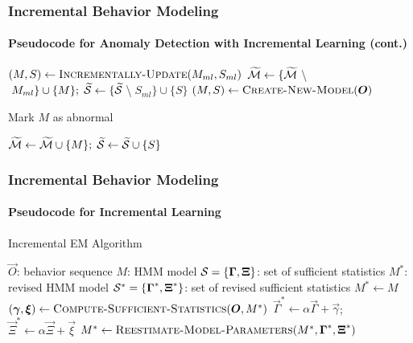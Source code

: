 \begin{frame}
    \frametitle{Incremental Behavior Modeling}
    \framesubtitle{Pseudocode for Anomaly Detection with 
        Incremental Learning (cont.)}

    \begin{algorithm}[H]
        \begin{algorithmic}
        
                \STATE $( M, S ) \gets \textsc{Incrementally-Update}(M_{ml}, S_{ml})$ 
                \STATE $\widetilde{\cal M} \gets \{ \widetilde{\cal
                    M}\;$\textbackslash$\;M_{ml} \} \cup \{ M \}; \; \widetilde{\cal S} \gets \{ \widetilde{\cal
                    S}\;$\textbackslash$\;S_{ml} \} \cup \{ S \}$ 
            \ELSE 
                \STATE $( M, S ) \gets \textsc{Create-New-Model}(\vec{O})$

                    \STATE Mark $M$ as abnormal 
                \ENDIF

                \STATE $\widetilde{\cal M} \gets \widetilde{\cal M} \cup \{ M \}; \; \widetilde{\cal S} \gets \widetilde{\cal S} \cup \{ S \}$ 
            \ENDIF
        \end{algorithmic}
    \end{algorithm}

\end{frame}


\begin{frame}
    \frametitle{Incremental Behavior Modeling}
    \framesubtitle{Pseudocode for Incremental Learning}

    \begin{algorithm}[H]
        \caption{Incremental EM Algorithm}
        \label{incremental-em-algorithm}
        \begin{algorithmic}
            \REQUIRE $\vec{O}$: behavior sequence
            \REQUIRE $M$: HMM model
            \REQUIRE ${\cal S} = \{ \vec{\Gamma}, \vec{\Xi} \}$: set of sufficient statistics
            \ENSURE $M^*$: revised HMM model
            \ENSURE ${\cal S}^* = \{ \vec{\Gamma}^*, \vec{\Xi}^* \}$: set of revised sufficient statistics
            \STATE $M^* \gets M$
                \STATE {}
                \STATE $(\vec{\gamma}, \vec{\xi}) \gets \textsc{Compute-Sufficient-Statistics}(\vec{O}, M^*)$
                \STATE $\vec{\Gamma}^* \gets \alpha \vec{\Gamma} + \vec{\gamma}$; \; $\vec{\Xi}^* \gets \alpha \vec{\Xi} + \vec{\xi}$
                \STATE {}
                \STATE $M^* \gets \textsc{Reestimate-Model-Parameters}(M^*, \vec{\Gamma}^*, \vec{\Xi}^*)$
            \ENDFOR
        \end{algorithmic}
    \end{algorithm}

\end{frame}

